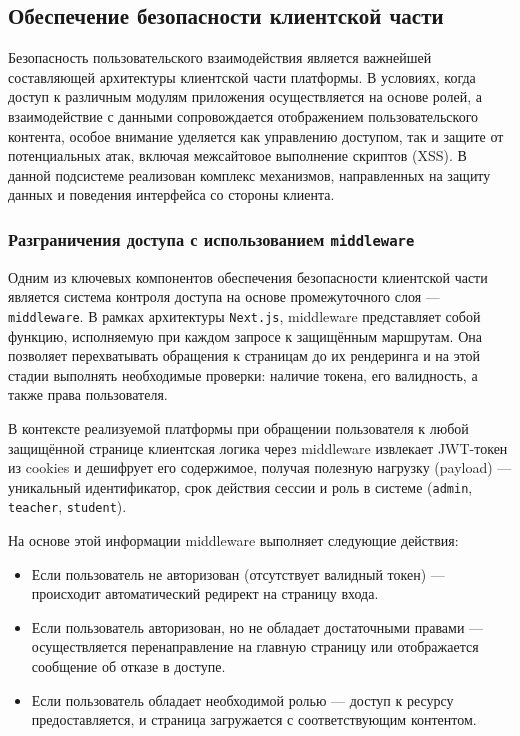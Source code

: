 \subsection{Обеспечение безопасности клиентской части}

Безопасность пользовательского взаимодействия является важнейшей составляющей архитектуры клиентской части платформы. В условиях, когда доступ к различным модулям приложения осуществляется на основе ролей, а взаимодействие с данными сопровождается отображением пользовательского контента, особое внимание уделяется как управлению доступом, так и защите от потенциальных атак, включая межсайтовое выполнение скриптов (XSS). В данной подсистеме реализован комплекс механизмов, направленных на защиту данных и поведения интерфейса со стороны клиента.

\subsubsection{Разграничения доступа с использованием \texttt{middleware}}
Одним из ключевых компонентов обеспечения безопасности клиентской части является система контроля доступа на основе промежуточного слоя — \texttt{middleware}\cite{nextjs_middleware}. В рамках архитектуры \texttt{Next.js}, middleware представляет собой функцию, исполняемую при каждом запросе к защищённым маршрутам. Она позволяет перехватывать обращения к страницам до их рендеринга и на этой стадии выполнять необходимые проверки: наличие токена, его валидность, а также права пользователя.

В контексте реализуемой платформы при обращении пользователя к любой защищённой странице клиентская логика через middleware извлекает JWT-токен из cookies и дешифрует его содержимое, получая полезную нагрузку (payload) — уникальный идентификатор, срок действия сессии и роль в системе (\texttt{admin}, \texttt{teacher}, \texttt{student}).

На основе этой информации middleware выполняет следующие действия:
\begin{itemize}
  \item Если пользователь не авторизован (отсутствует валидный токен) — происходит автоматический редирект на страницу входа.
  \item Если пользователь авторизован, но не обладает достаточными правами — осуществляется перенаправление на главную страницу или отображается сообщение об отказе в доступе.
  \item Если пользователь обладает необходимой ролью — доступ к ресурсу предоставляется, и страница загружается с соответствующим контентом.
\end{itemize}

